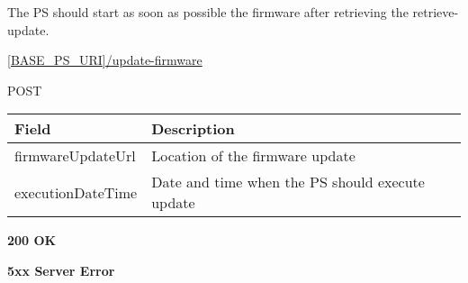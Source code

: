 The \acs{PS} should start as soon as possible the firmware after retrieving the retrieve-update.

 \url{[BASE_PS_URI]/update-firmware}

 POST

\begin{table}[!h]
\vspace{-7mm}
\begin{tabularx}{\linewidth}{ | l | X | }
  \hline
  \rowcolor{table-head}
  Field & Description \\
  \hline
  firmwareUpdateUrl 		& Location of the firmware update \\
  executionDateTime	&  Date and time when the \acs{PS} should execute update \\
  \hline
\end{tabularx}
\end{table}

 \textbf{200 OK}

 \textbf{5xx Server Error}